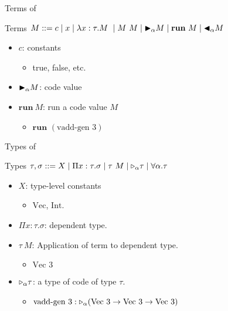 \documentclass[dvipdfmx,aspectratio=169, 20pt]{beamer}
\begin{document}
\begin{frame}[fragile]{Terms of \LMD}
    \begin{block}{Terms}
        \( M ::= c \mid x \mid \lambda x:\tau.M\ \mid M\ M \mid {\mathop{\blacktriangleright}}_\alpha M \mid \textbf{run}\ M \mid {\mathop{\blacktriangleleft}}_\alpha M \)
    \end{block}
    \begin{itemize}
        \item \( c \): constants
            \begin{itemize}
                    \item true, false, etc.
            \end{itemize}
        \item \( {\mathop{\blacktriangleright}}_\alpha M \): code value
        \item \( \textbf{run}\ M \): run a code value \( M \)
            \begin{itemize}
                \item \( \textbf{run }(\text{vadd-gen }3)\)
            \end{itemize}
    \end{itemize}
\end{frame}

\begin{frame}[fragile]{Types of \LMD}
    \begin{block}{Types}
    \( \tau,\sigma ::= X \mid \Pi x:\tau.\sigma \mid \tau\ M \mid {\mathop{\triangleright}}_{\alpha} \tau \mid \forall\alpha.\tau \)
    \end{block}
    \begin{itemize}
        \item \( X \): type-level constants 
            \begin{itemize}
                \item \( \text{Vec} \), \( \text{Int} \).
            \end{itemize}
        \item \( \Pi x:\tau.\sigma \): dependent type.
        \item \( \tau\ M \): Application of term to dependent type.
            \begin{itemize}
                \item \( \text{Vec } 3 \)
            \end{itemize}
        \item \( {\mathop{\triangleright}}_{\alpha} \tau \): a type of code of type \( \tau \).
            \begin{itemize}
                \item \( \text{vadd-gen 3} : {\mathop{\triangleright}}_\alpha (\text{Vec}\ 3 \to \text{Vec}\ 3 \to \text{Vec}\ 3) \)
            \end{itemize}
    \end{itemize}
    \note{
    }
\end{frame}
\end{document}
